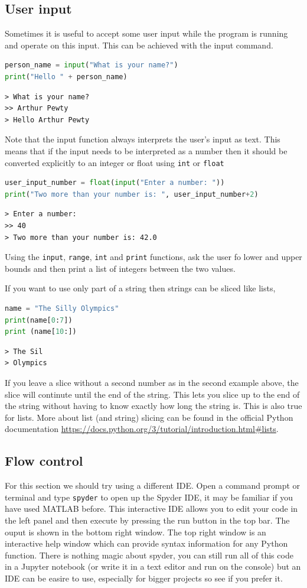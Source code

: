 	\subsection{User input}
		Sometimes it is useful to accept some user input while the program is running and operate on this input. This can be achieved with the input command.
		\begin{lstlisting}[language=Python]
person_name = input("What is your name?")
print("Hello " + person_name)\end{lstlisting}
		\begin{verbatim}
> What is your name?
>> Arthur Pewty
> Hello Arthur Pewty\end{verbatim}
		Note that the input function always interprets the user's input as text. This means that if the input needs to be interpreted as a number then it should be converted explicitly to an integer or float using \texttt{int} or \texttt{float}
		\begin{lstlisting}[language=Python]
user_input_number = float(input("Enter a number: "))
print("Two more than your number is: ", user_input_number+2)\end{lstlisting}
		\begin{verbatim}
> Enter a number: 
>> 40
> Two more than your number is: 42.0\end{verbatim}
\begin{task}Using the \texttt{input}, \texttt{range}, \texttt{int} and \texttt{print} functions, ask the user fo lower and upper bounds and then print a list of integers between the two values.\end{task}
If you want to use only part of a string then strings can be sliced like lists,
		\begin{lstlisting}[language=Python]
name = "The Silly Olympics"
print(name[0:7])
print (name[10:])\end{lstlisting}
\begin{verbatim}
> The Sil
> Olympics\end{verbatim}
If you leave a slice without a second number as in the second example above, the slice will continute until the end of the string. This lets you slice up to the end of the string without having to know exactly how long the string is. This is also true for lists. More about list (and string) slicing can be found in the official Python documentation \url{https://docs.python.org/3/tutorial/introduction.html#lists}.
	\subsection{Flow control}
	For this section we should try using a different IDE. Open a command prompt or terminal and type \texttt{spyder} to open up the Spyder IDE, it may be familiar if you have used MATLAB before. This interactive IDE allows you to edit your code in the left panel and then execute by pressing the run button in the top bar. The ouput is shown in the bottom right window. The top right window is an interactive help window which can provide syntax information for any Python function. There is nothing magic about spyder, you can still run all of this code in a Jupyter notebook (or write it in a text editor and run on the console) but an IDE can be easire to use, especially for bigger projects so see if you prefer it.
